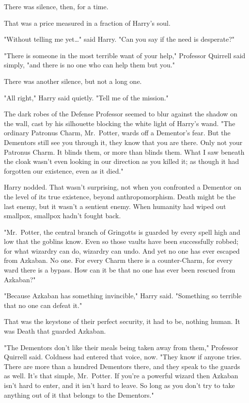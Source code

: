 There was silence, then, for a time.

That was a price measured in a fraction of Harry's soul.

"Without telling me yet{\ldots}" said Harry. "Can you say if the need is
desperate?"

"There is someone in the most terrible want of your help," Professor Quirrell
said simply, "and there is no one who can help them but you."

There was another silence, but not a long one.

"All right," Harry said quietly. "Tell me of the mission."

The dark robes of the Defense Professor seemed to blur against the shadow on
the wall, cast by his silhouette blocking the white light of Harry's wand. "The
ordinary Patronus Charm, Mr.~Potter, wards off a Dementor's fear. But the
Dementors still see you through it, they know that you are there. Only not your
Patronus Charm. It blinds them, or more than blinds them. What I saw beneath
the cloak wasn't even looking in our direction as you killed it; as though it
had forgotten our existence, even as it died."

Harry nodded. That wasn't surprising, not when you confronted a Dementor on the
level of its true existence, beyond anthropomorphism. Death might be the last
enemy, but it wasn't a sentient enemy. When humanity had wiped out smallpox,
smallpox hadn't fought back.

"Mr.~Potter, the central branch of Gringotts is guarded by every spell high and
low that the goblins know. Even so those vaults have been successfully robbed;
for what wizardry can do, wizardry can undo. And yet no one has ever escaped
from Azkaban. No one. For every Charm there is a counter-Charm, for every ward
there is a bypass. How can it be that no one has ever been rescued from
Azkaban?"

"Because Azkaban has something invincible," Harry said. "Something so terrible
that no one can defeat it."

That was the keystone of their perfect security, it had to be, nothing human.
It was Death that guarded Azkaban.

"The Dementors don't like their meals being taken away from them," Professor
Quirrell said. Coldness had entered that voice, now. "They know if anyone
tries. There are more than a hundred Dementors there, and they speak to the
guards as well. It's that simple, Mr.~Potter. If you're a powerful wizard then
Azkaban isn't hard to enter, and it isn't hard to leave. So long as you don't
try to take anything out of it that belongs to the Dementors."

